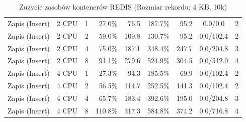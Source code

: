 \begin{table}[ht]
{\begin{tabular}{llcrrrrcc}
Zapis (Insert) & 2 CPU & 1 & 27.0\% & 76.5 & 187.7\% & 95.2 & 0.0/0.0 & 2 \\
Zapis (Insert) & 2 CPU & 2 & 59.0\% & 109.8 & 130.7\% & 95.2 & 0.0/102.4 & 2 \\
Zapis (Insert) & 2 CPU & 4 & 75.0\% & 187.1 & 348.4\% & 247.7 & 0.0/204.8 & 3 \\
Zapis (Insert) & 2 CPU & 8 & 91.1\% & 279.6 & 524.9\% & 304.5 & 0.0/512.0 & 4 \\
Zapis (Insert) & 4 CPU & 1 & 27.3\% & 94.3 & 185.5\% & 69.9 & 0.0/102.4 & 2 \\
Zapis (Insert) & 4 CPU & 2 & 56.5\% & 114.7 & 252.5\% & 141.3 & 0.0/102.4 & 2 \\
Zapis (Insert) & 4 CPU & 4 & 65.7\% & 183.4 & 392.6\% & 195.0 & 0.0/204.8 & 3 \\
Zapis (Insert) & 4 CPU & 8 & 110.8\% & 317.3 & 584.8\% & 374.2 & 0.0/716.8 & 4 \\
\bottomrule
\end{tabular}%
}
\caption{Zużycie zasobów kontenerów REDIS (Rozmiar rekordu: 4 KB, 10k)}
\label{tab:resources_redis_medium_10000}
\end{table}

